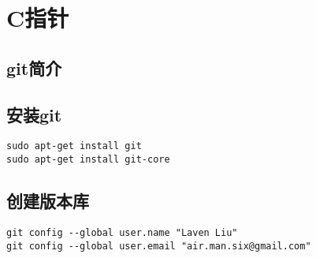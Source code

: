\chapter{C指针}

\section{git简介}

\section{安装git}

\begin{verbatim}
sudo apt-get install git
sudo apt-get install git-core
\end{verbatim}

\section{创建版本库}

\begin{verbatim}
git config --global user.name "Laven Liu"
git config --global user.email "air.man.six@gmail.com"
\end{verbatim}



